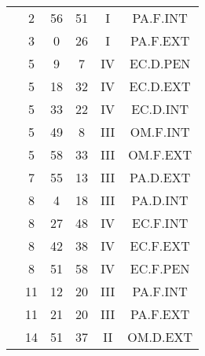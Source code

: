 \documentclass[12pt, a4paper]{article}
\begin{document}
\begin{multicols}{3}
{\begin{tabular}{c c c c c c}
	 	 	 	 & 2 & 56 & 51 & I & PA.F.INT\\%
	 	 	 	 & 3 & 0 & 26 & I & PA.F.EXT\\%
	 	 	 	 & 5 & 9 & 7 & IV & EC.D.PEN\\%
	 	 	 	 & 5 & 18 & 32 & IV & EC.D.EXT\\%
	 	 	 	 & 5 & 33 & 22 & IV & EC.D.INT\\%
	 	 	 	 & 5 & 49 & 8 & III & OM.F.INT\\%
	 	 	 	 & 5 & 58 & 33 & III & OM.F.EXT\\%
	 	 	 	 & 7 & 55 & 13 & III & PA.D.EXT\\%
	 	 	 	 & 8 & 4 & 18 & III & PA.D.INT\\%
	 	 	 	 & 8 & 27 & 48 & IV & EC.F.INT\\%
	 	 	 	 & 8 & 42 & 38 & IV & EC.F.EXT\\%
	 	 	 	 & 8 & 51 & 58 & IV & EC.F.PEN\\%
	 	 	 	 & 11 & 12 & 20 & III & PA.F.INT\\%
	 	 	 	 & 11 & 21 & 20 & III & PA.F.EXT\\%
	 	 	 	 & 14 & 51 & 37 & II & OM.D.EXT\\%
	 	 \end{tabular}
 	}
\end{multicols}
\end{document}
